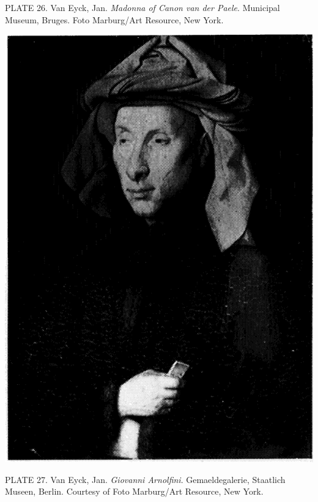 PLATE 26. Van Eyck, Jan. \emph{Madonna of Canon van der Paele}.
Municipal Museum, Bruges. Foto Marburg/Art Resource, New York.

\protect\hypertarget{20_ILLUSTRATIONS_FOLLOW_PAGE.xhtmlux5cux23id_25}{}{}\includegraphics{include/html/images/345_1.png}

PLATE 27. Van Eyck, Jan. \emph{Giovanni Arnolfini}. Gemaeldegalerie,
Staatlich Museen, Berlin. Courtesy of Foto Marburg/Art Resource, New
York.


